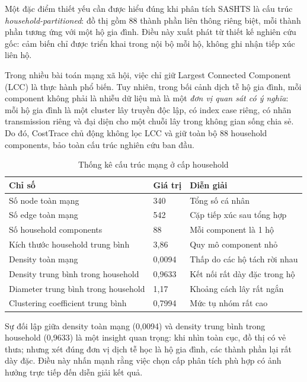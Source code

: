 \documentclass[12pt,a4paper]{report}
\theoremstyle{definition}
\begin{document}
Một đặc điểm thiết yếu cần được hiểu đúng khi phân tích SASHTS là cấu trúc \textit{household-partitioned}: đồ thị gồm 88 thành phần liên thông riêng biệt, mỗi thành phần tương ứng với một hộ gia đình. Điều này xuất phát từ thiết kế nghiên cứu gốc: cảm biến chỉ được triển khai trong nội bộ mỗi hộ, không ghi nhận tiếp xúc liên hộ.

Trong nhiều bài toán mạng xã hội, việc chỉ giữ Largest Connected Component (LCC) là thực hành phổ biến. Tuy nhiên, trong bối cảnh dịch tễ hộ gia đình, mỗi component không phải là nhiễu dữ liệu mà là một \textit{đơn vị quan sát có ý nghĩa}: mỗi hộ gia đình là một cluster lây truyền độc lập, có index case riêng, có nhãn transmission riêng và đại diện cho một chuỗi lây trong không gian sống chia sẻ. Do đó, CostTrace chủ động không lọc LCC và giữ toàn bộ 88 household components, bảo toàn cấu trúc nghiên cứu ban đầu.

\begin{table}[H]
\centering
\caption{Thống kê cấu trúc mạng ở cấp household}
\label{tab:network_structure}
\begin{tabular}{L{6.5cm} C{3.5cm} L{4.5cm}}
\toprule
\textbf{Chỉ số} & \textbf{Giá trị} & \textbf{Diễn giải}\\
\midrule
Số node toàn mạng              & 340    & Tổng số cá nhân\\
Số edge toàn mạng              & 542    & Cặp tiếp xúc sau tổng hợp\\
Số household components        & 88     & Mỗi component là 1 hộ\\
Kích thước household trung bình & 3,86  & Quy mô component nhỏ\\
Density toàn mạng              & 0,0094 & Thấp do các hộ tách rời nhau\\
Density trung bình trong household & 0,9633 & Kết nối rất dày đặc trong hộ\\
Diameter trung bình trong household & 1,17 & Khoảng cách lây rất ngắn\\
Clustering coefficient trung bình & 0,7994 & Mức tụ nhóm rất cao\\
\bottomrule
\end{tabular}
\end{table}

Sự đối lập giữa density toàn mạng (0,0094) và density trung bình trong household (0,9633) là một insight quan trọng: khi nhìn toàn cục, đồ thị có vẻ thưa; nhưng xét đúng đơn vị dịch tễ học là hộ gia đình, các thành phần lại rất dày đặc. Điều này nhấn mạnh rằng việc chọn cấp phân tích phù hợp có ảnh hưởng trực tiếp đến diễn giải kết quả.
\end{document}
